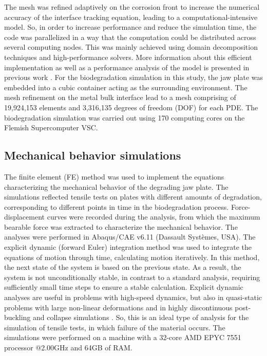 The mesh was refined adaptively on the corrosion front to increase the numerical accuracy of the interface tracking equation, leading to a computational-intensive model. So, in order to increase performance and reduce the simulation time, the code was parallelized in a way that the computation could be distributed across several computing nodes. This was mainly achieved using domain decomposition techniques and high-performance solvers. More information about this efficient implementation as well as a performance analysis of the model is presented in previous work \cite{Barzegari2022}. For the biodegradation simulation in this study, the jaw plate was embedded into a cubic container acting as the surrounding environment. The mesh refinement on the metal bulk interface lead to a mesh comprising of 19,924,153 elements and 3,316,135 degrees of freedom (DOF) for each PDE. The biodegradation simulation was carried out using 170 computing cores on the Flemish Supercomputer VSC.


\subsection{Mechanical behavior simulations}
\label{sec:FEA}

The finite element (FE) method was used to implement the equations characterizing the mechanical behavior of the degrading jaw plate. The simulations reflected tensile tests on plates with different amounts of degradation, corresponding to different points in time in the biodegradation process. Force-displacement curves were recorded during the analysis, from which the maximum bearable force was extracted to characterize the mechanical behavior. The analyses were performed in Abaqus/CAE v6.11 (Dassault Systèmes, USA). The explicit dynamic (forward Euler) integration method was used to integrate the equations of motion through time, calculating motion iteratively. In this method, the next state of the system is based on the previous state. As a result, the system is not unconditionally stable, in contrast to a standard analysis, requiring sufficiently small time steps to ensure a stable calculation. Explicit dynamic analyses are useful in problems with high-speed dynamics, but also in quasi-static problems with large non-linear deformations and in highly discontinuous post-buckling and collapse simulations \cite{explicit2}. So, this is an ideal type of analysis for the simulation of tensile tests, in which failure of the material occurs. The simulations were performed on a machine with a 32-core AMD EPYC 7551 processor @2.00GHz and 64GB of RAM.

